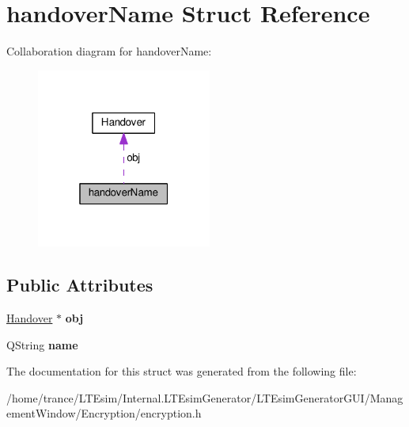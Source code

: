 \hypertarget{structhandover_name}{}\section{handover\+Name Struct Reference}
\label{structhandover_name}


Collaboration diagram for handover\+Name\+:
\nopagebreak
\begin{figure}[H]
\begin{center}
\leavevmode
\includegraphics[width=163pt]{structhandover_name__coll__graph}
\end{center}
\end{figure}
\subsection*{Public Attributes}
\begin{DoxyCompactItemize}
\item 
\hyperlink{class_handover}{Handover} $\ast$ {\bfseries obj}\hypertarget{structhandover_name_a5626a26d3d1c5b2cba3e2ef32dccef74}{}\label{structhandover_name_a5626a26d3d1c5b2cba3e2ef32dccef74}

\item 
Q\+String {\bfseries name}\hypertarget{structhandover_name_a3a66e14c88f16e5bdbda04bfba71e361}{}\label{structhandover_name_a3a66e14c88f16e5bdbda04bfba71e361}

\end{DoxyCompactItemize}


The documentation for this struct was generated from the following file\+:\begin{DoxyCompactItemize}
\item 
/home/trance/\+L\+T\+Esim/\+Internal.\+L\+T\+Esim\+Generator/\+L\+T\+Esim\+Generator\+G\+U\+I/\+Management\+Window/\+Encryption/encryption.\+h\end{DoxyCompactItemize}
